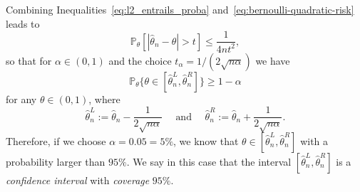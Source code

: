 \documentclass[
	fontsize=11pt, %
	twoside=false, %
	numbers=noenddot, %
]{kaobook}
\renewcommand{\P}{\mathbb P}
\newcommand{\wh}{\widehat}
\begin{document}

Combining Inequalities~\eqref{eq:l2_entrails_proba} and~\eqref{eq:bernoulli-quadratic-risk} leads to
\begin{equation*}
	\P_\theta[ |\wh \theta_n - \theta| > t] \leq \frac{1}{4 n t^2},
\end{equation*}
so that for $\alpha \in (0, 1)$ and the choice $t_\alpha = 1 / (2 \sqrt{n \alpha})$ we have 
\begin{equation}
	\label{eq:bernoulli-first-ci}
	\P_\theta \big\{ \theta \in [ \wh \theta_n^L, \wh \theta_n^R ] \big\} \geq 1 - \alpha
\end{equation}
for any $\theta \in (0,1 )$, where
\begin{equation*}
	\wh \theta_n^L := \wh \theta_n - \frac{1}{2 \sqrt{n \alpha}} \quad \text{ and } 
	\quad \wh \theta_n^R := \wh \theta_n + \frac{1}{2 \sqrt{n \alpha}}.
\end{equation*}
Therefore, if we choose $\alpha = 0.05 = 5\%$, we know that $\theta \in [\wh \theta_n^L, \wh \theta_n^R]$ with a probability larger than $95\%$.
We say in this case that the interval $[\wh \theta_n^L, \wh \theta_n^R]$ is a \emph{confidence interval} with \emph{coverage} $95\%$.%
\end{document}
